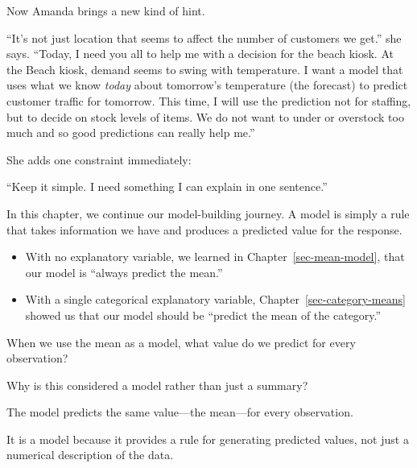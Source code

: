 \documentclass[
  12pt,
  letterpaper,
  DIV=11,
  numbers=noendperiod]{scrreprt}
\begin{document}
Now Amanda brings a new kind of hint.

``It's not just location that seems to affect the number of customers we
get.'' she says. ``Today, I need you all to help me with a decision for
the beach kiosk. At the Beach kiosk, demand seems to swing with
temperature. I want a model that uses what we know \emph{today} about
tomorrow's temperature (the forecast) to predict customer traffic for
tomorrow. This time, I will use the prediction not for staffing, but to
decide on stock levels of items. We do not want to under or overstock
too much and so good predictions can really help me.''

She adds one constraint immediately:

``Keep it simple. I need something I can explain in one sentence.''

In this chapter, we continue our model-building journey. A model is
simply a rule that takes information we have and produces a predicted
value for the response.

\begin{itemize}
\item
  With no explanatory variable, we learned in
  Chapter~\ref{sec-mean-model}, that our model is ``always predict the
  mean.''
\item
  With a single categorical explanatory variable,
  Chapter~\ref{sec-category-means} showed us that our model should be
  ``predict the mean of the category.''
\end{itemize}

\begin{tcolorbox}[enhanced jigsaw, colback=white, leftrule=.75mm, toprule=.15mm, bottomtitle=1mm, breakable, coltitle=black, toptitle=1mm, title=\textcolor{quarto-callout-note-color}{\faInfo}\hspace{0.5em}{Quick Check}, opacitybacktitle=0.6, colbacktitle=quarto-callout-note-color!10!white, arc=.35mm, left=2mm, colframe=quarto-callout-note-color-frame, titlerule=0mm, rightrule=.15mm, bottomrule=.15mm, opacityback=0]

When we use the mean as a model, what value do we predict for every
observation?

Why is this considered a model rather than just a summary?

\end{tcolorbox}

\begin{tcolorbox}[enhanced jigsaw, colback=white, leftrule=.75mm, toprule=.15mm, bottomtitle=1mm, breakable, coltitle=black, toptitle=1mm, title=\textcolor{quarto-callout-note-color}{\faInfo}\hspace{0.5em}{Answer}, opacitybacktitle=0.6, colbacktitle=quarto-callout-note-color!10!white, arc=.35mm, left=2mm, colframe=quarto-callout-note-color-frame, titlerule=0mm, rightrule=.15mm, bottomrule=.15mm, opacityback=0]

The model predicts the same value---the mean---for every observation.

It is a model because it provides a rule for generating predicted
values, not just a numerical description of the data.

\end{tcolorbox}
\end{document}
